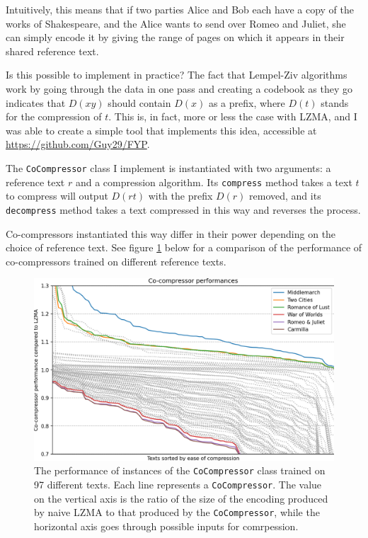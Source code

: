 Intuitively, this means that if two parties Alice and Bob each have a copy of the works of Shakespeare, and the Alice wants to send over Romeo and Juliet, she can simply encode it by giving the range of pages on which it appears in their shared reference text.

Is this possible to implement in practice? The fact that Lempel-Ziv algorithms work by going through the data in one pass and creating a codebook as they go indicates that $D(xy)$ should contain $D(x)$ as a prefix, where $D(t)$ stands for the compression of $t$. This is, in fact, more or less the case with LZMA, and I was able to create a simple tool that implements this idea, accessible at \url{https://github.com/Guy29/FYP}.

The \texttt{CoCompressor} class I implement is instantiated with two arguments: a reference text $r$ and a compression algorithm. Its \texttt{compress} method takes a text $t$ to compress will output $D(rt)$ with the prefix $D(r)$ removed, and its \texttt{decompress} method takes a text compressed in this way and reverses the process.

Co-compressors instantiated this way differ in their power depending on the choice of reference text. See figure \ref{fig:cocomp_comparison} below for a comparison of the performance of co-compressors trained on different reference texts.

\begin{figure}[h]
\centering
\includegraphics[width=\textwidth]{img/fig_cocomp_performance.png}
\caption{The performance of instances of the \texttt{CoCompressor} class trained on 97 different texts. Each line represents a \texttt{CoCompressor}. The value on the vertical axis is the ratio of the size of the encoding produced by naive LZMA to that produced by the \texttt{CoCompressor}, while the horizontal axis goes through possible inputs for comrpession.}
\label{fig:cocomp_comparison}
\end{figure}

